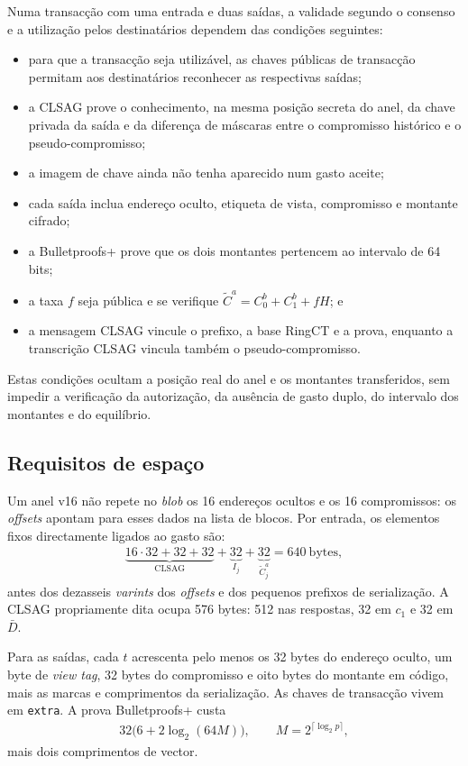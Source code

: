 Numa transacção com uma entrada e duas saídas, a validade segundo o consenso e
a utilização pelos destinatários dependem das condições seguintes:
\begin{itemize}
 \item para que a transacção seja utilizável, as chaves públicas de transacção
 permitam aos destinatários reconhecer as respectivas saídas;
 \item a CLSAG prove o conhecimento, na mesma posição secreta do anel, da
 chave privada da saída e da diferença de máscaras entre o compromisso
 histórico e o pseudo-compromisso;
 \item a imagem de chave ainda não tenha aparecido num gasto aceite;
 \item cada saída inclua endereço oculto, etiqueta de vista, compromisso e
 montante cifrado;
 \item a Bulletproofs+ prove que os dois montantes pertencem ao intervalo de
 64 bits;
 \item a taxa \(f\) seja pública e se verifique
 \(\widetilde C^a=C^b_0+C^b_1+fH\); e
 \item a mensagem CLSAG vincule o prefixo, a base RingCT e a prova, enquanto a
 transcrição CLSAG vincula também o pseudo-compromisso.
\end{itemize}
Estas condições ocultam a posição real do anel e os montantes transferidos,
sem impedir a verificação da autorização, da ausência de gasto duplo, do
intervalo dos montantes e do equilíbrio.


\subsection{Requisitos de espaço}
\label{subsec:space-and-ver-rcttypefull}

Um anel v16 não repete no \emph{blob} os 16 endereços ocultos e os 16
compromissos: os \emph{offsets} apontam para esses dados na lista de blocos. Por
entrada, os elementos fixos directamente ligados ao gasto são:
\begin{align*}
 \underbrace{16\cdot32+32+32}_{\text{CLSAG}}
 +\underbrace{32}_{I_j}
 +\underbrace{32}_{\widetilde C^a_j}
 =640\ \text{bytes},
\end{align*}
antes dos dezasseis \emph{varints} dos \emph{offsets} e dos pequenos
prefixos de serialização. A CLSAG propriamente dita ocupa 576 bytes: 512 nas
respostas, 32 em \(c_1\) e 32 em \(\bar D\).

Para as saídas, cada \(t\) acrescenta pelo menos os 32 bytes do endereço
oculto, um byte de \emph{view tag}, 32 bytes do compromisso e oito bytes do
montante em código, mais as marcas e comprimentos da serialização. As chaves
de transacção vivem em \texttt{extra}. A prova Bulletproofs+ custa
\begin{align*}
 32\bigl(6+2\log_2(64M)\bigr),
 \qquad M=2^{\lceil\log_2p\rceil},
\end{align*}
mais dois comprimentos de vector.

